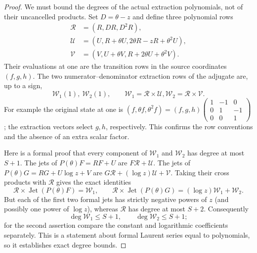 \documentclass[11pt,a4paper]{article}
\theoremstyle{definition}
\theoremstyle{remark}
\numberwithin{equation}{section}
\begin{document}
\begin{proof}
We must bound the degrees of the actual extraction polynomials, not
of their uncancelled products. Set $D=\theta-z$ and define three
polynomial rows
\begin{align*}
 \mathcal R&=(R,DR,D^2R),\\
 \mathcal U&=(U,R+\theta U,2\theta R-zR+\theta^2U),\\
 \mathcal V&=(V,U+\theta V,R+2\theta U+\theta^2V).
\end{align*}
Their evaluations at one are the transition rows in the source
coordinates $(f,g,h)$. The two numerator--denominator extraction
rows of the adjugate are, up to a sign,
\[
 \mathcal W_1(1),\ \mathcal W_2(1),\qquad
 \mathcal W_1=\mathcal R\times\mathcal U,
 \mathcal W_2=\mathcal R\times\mathcal V.
\]
For example the original state at one is
$(f,\theta f,\theta^2f)=(f,g,h)
 \left(\begin{smallmatrix}1&-1&0\\0&1&-1\\0&0&1\end{smallmatrix}\right)$;
the extraction vectors select $g,h$, respectively. This confirms
the row conventions and the absence of an extra scalar factor.

Here is a formal proof that every component of $\mathcal W_1$ and
$\mathcal W_2$ has degree at most $S+1$.
The jets of $P(\theta)F=RF+U$ are
$F\mathcal R+\mathcal U$. The jets of
$P(\theta)G=RG+U\log z+V$ are
$G\mathcal R+(\log z)\mathcal U+\mathcal V$.
Taking their cross products with $\mathcal R$ gives the exact identities
\[
 \mathcal R\times\operatorname{Jet}(P(\theta)F)=\mathcal W_1,\qquad
 \mathcal R\times\operatorname{Jet}(P(\theta)G)
   =(\log z)\mathcal W_1+\mathcal W_2.
\]
But each of the first two formal jets has strictly negative powers
of $z$ (and possibly one power of $\log z$), whereas
$\mathcal R$ has degree at most $S+2$. Consequently
\[
 \deg\mathcal W_1\le S+1,\qquad
 \deg\mathcal W_2\le S+1;
\]
for the second assertion compare the constant and logarithmic
coefficients separately. This is a statement about formal Laurent
series equal to polynomials, so it establishes exact degree bounds.


\end{proof}
\end{document}
